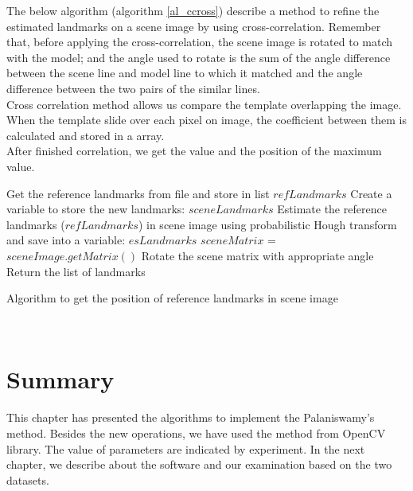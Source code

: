 The below algorithm (algorithm \ref{al_ccross}) describe a method to refine the estimated landmarks on a scene image by using cross-correlation. Remember that, before applying the cross-correlation, the scene image is rotated to match with the model; and the angle used to rotate is the sum of the angle difference between the scene line and model line to which it matched and the angle difference between the two pairs of the similar lines.\\
Cross correlation method allows us compare the template overlapping the image. When the template slide over each pixel on image, the coefficient between them is calculated and stored in a array.\\[0.2cm]
After finished correlation, we get the value and the position of the maximum value.\\[0.2cm]
\begin{algorithm}[H]
\Indm 
{}
\SetAlgoLined
{}
\Indp
Get the reference landmarks from file and store in list $refLandmarks$\;
Create a variable to store the new landmarks: $sceneLandmarks$\;
Estimate the reference landmarks ($refLandmarks$) in scene image using probabilistic Hough transform and save into a variable: $esLandmarks$\;
$sceneMatrix$ = $sceneImage.getMatrix()$\;
Rotate the scene matrix with appropriate angle\;
Return the list of landmarks\;
\caption{Algorithm to get the position of reference landmarks in scene image}
\label{al_ccross}
\end{algorithm}~\\
\section{Summary}
This chapter has presented the algorithms to implement the Palaniswamy's method. Besides the new operations, we have used the method from OpenCV library. The value of parameters are indicated by experiment. In the next chapter, we describe about the software and our examination based on the two datasets.